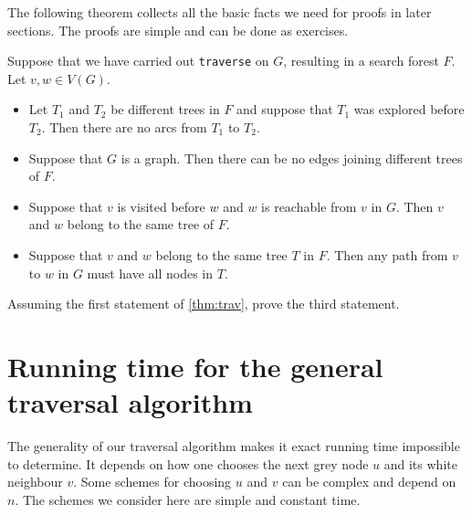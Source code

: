 The following theorem collects all the basic facts we need for proofs
in later sections. The proofs are simple and can be done as exercises. 

\begin{Theorem} \label{thm:trav}
Suppose that we have carried out \texttt{traverse} on $G$, 
resulting in a search forest $F$. Let $v, w \in V(G)$.
\begin{itemize}
  \item Let $T_1$ and $T_2$ be different trees in $F$ and suppose that $T_1$ was explored before $T_2$. 
  Then there are no arcs from $T_1$ to $T_2$. 
  \item Suppose that $G$ is a graph. Then there can be no edges joining different trees of $F$.
  \item Suppose that $v$ is visited before $w$ and $w$ is reachable from $v$ in $G$. 
  Then $v$ and $w$ belong to the same tree of $F$.
  \item Suppose that $v$ and $w$ belong to the same tree $T$ in $F$. 
  Then any path from $v$ to $w$ in $G$ must have all nodes in $T$.
\end{itemize}
\end{Theorem}

\begin{Boxample}[5]
Assuming the first statement of \cref{thm:trav}, prove the third statement.
\end{Boxample}

\section{Running time for the general traversal algorithm}
The generality of our traversal algorithm makes it exact running time impossible to determine.  
It depends on how one chooses the next grey node $u$ and its white neighbour $v$.  
Some schemes for choosing $u$ and $v$ can be complex and depend on $n$. 
The schemes we consider here are simple and constant time.


